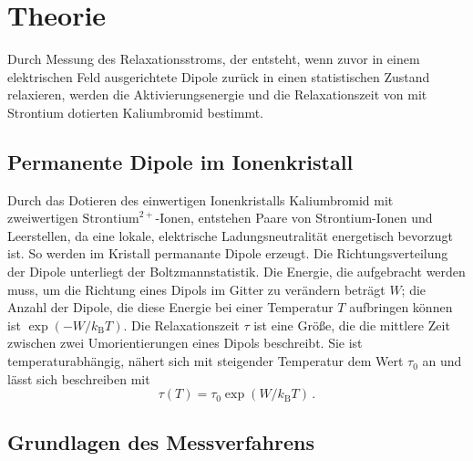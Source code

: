 \section{Theorie}

Durch Messung des Relaxationsstroms, der entsteht, wenn zuvor in einem elektrischen Feld ausgerichtete Dipole zurück in einen statistischen Zustand relaxieren, werden die Aktivierungsenergie und die Relaxationszeit von mit Strontium dotierten Kaliumbromid bestimmt.

\subsection{Permanente Dipole im Ionenkristall}

Durch das Dotieren des einwertigen Ionenkristalls Kaliumbromid mit zweiwertigen $\text{Strontium}^{2+}$-Ionen, entstehen Paare von Strontium-Ionen und Leerstellen, da eine lokale, elektrische Ladungsneutralität energetisch bevorzugt ist. So werden im Kristall permanante Dipole erzeugt. Die Richtungsverteilung der Dipole unterliegt der Boltzmannstatistik. Die Energie, die aufgebracht werden muss, um die Richtung eines Dipols im Gitter zu verändern beträgt $W$; die Anzahl der Dipole, die diese Energie bei einer Temperatur $T$ aufbringen können ist $\exp \left( -W/k_\text{B}T \right)$. Die Relaxationszeit $\tau$ ist eine Größe, die die mittlere Zeit zwischen zwei Umorientierungen eines Dipols beschreibt. Sie ist temperaturabhängig, nähert sich mit steigender Temperatur dem Wert $\tau_0$ an und lässt sich beschreiben mit
\begin{equation}
  \tau(T) = \tau_0 \exp \left( W/k_\text{B}T \right)\,.
\end{equation}

\subsection{Grundlagen des Messverfahrens}


